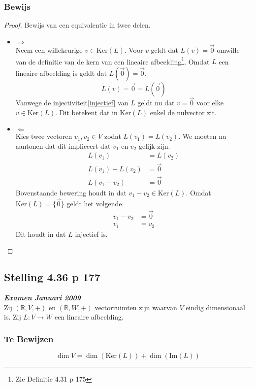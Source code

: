 \documentclass[lineaire_algebra_oplossingen.tex]{subfiles}
\begin{document}
\subsubsection*{Bewijs}
\begin{proof}
Bewijs van een equivalentie in twee delen.
\begin{itemize}
\item $\Rightarrow$\\
Neem een willekeurige $v\in \text{Ker}(L)$. Voor $v$ geldt dat $L(v) = \vec{0}$ omwille van de definitie van de kern van een lineaire afbeelding\footnote{Zie Definitie 4.31 p 175}. Omdat $L$ een lineaire afbeelding is geldt dat $L(\vec{0}) = \vec{0}$.
\[
L(v) = \vec{0} = L(\vec{0})
\]
Vanwege de injectiviteit\ref{injectief} van $L$ geldt nu dat $v=\vec{0}$ voor elke $v \in \text{Ker}(L)$. Dit betekent dat in $\text{Ker}(L)$ enkel de nulvector zit.

\item $\Leftarrow$\\
Kies twee vectoren $v_1,v_2 \in V$ zodat $L(v_1)=L(v_2)$. We moeten nu aantonen dat dit impliceert dat $v_1$ en $v_2$ gelijk zijn.
\begin{align*}
L(v_1) &= L(v_2) \\
L(v_1)-L(v_2) &= \vec{0} \\
L(v_1-v_2) &= \vec{0}
\end{align*}
Bovenstaande bewering houdt in dat $v_1-v_2 \in \text{Ker}(L)$. Omdat $\text{Ker}(L) = \{\vec{0}\}$ geldt het volgende.
\begin{align*}
v_1-v_2 &= \vec{0} \\
v_1 &= v_2
\end{align*}
Dit houdt in dat $L$ injectief is.
\end{itemize}
\end{proof}


\subsection{Stelling 4.36 p 177}
\label{4.36}
\textit{\textbf{Examen Januari 2009}}\\
Zij $(\mathbb{R},V,+)$ en $(\mathbb{R},W,+)$ vectorruimten zijn waarvan $V$ eindig dimensionaal is. Zij $L:V\rightarrow W$ een lineaire afbeelding.
\subsubsection*{Te Bewijzen}
\[
\dim V = \dim (\text{Ker}(L)) + \dim (\text{Im}(L))
\]
\end{document}
